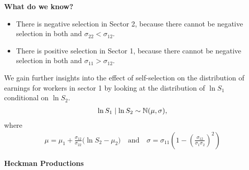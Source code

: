 \begin{frame}
	\textbf{What do we know?}\medskip
	\begin{itemize}\setlength\itemsep{1em}
		\item There is negative selection in Sector 2, because there cannot be negative selection in both and $\sigma_{22} < \sigma_{12}$.
		\item There is positive selection in Sector 1, because there cannot be negative selection in both and $\sigma_{11} > \sigma_{12}$.
	\end{itemize}
\end{frame}
\begin{frame}
	We gain further insights into the effect of self-selection on the distribution of earnings for workers in sector 1 by looking at the  distribution of $\ln S_1$  conditional on $\ln S_2$.
	\begin{align*}
	\ln S_1 \mid \ln S_2 \sim \mathbb{N} (\mu, \sigma),
	\end{align*}
	where
	\begin{align*}
	\mu = \mu_1 + \frac{\sigma_{12}}{\sigma_{22}} \Bigg(\ln S_2 - \mu_2\Bigg) \quad\text{and}\quad
	\sigma = \sigma_{11} \left(1 - \left(\frac{\sigma_{12}}{\sigma_1 \sigma_2}\right)^2\right)
	\end{align*}
\end{frame}
\begin{frame}
	\begin{center}
		\LARGE\textbf{Heckman Productions}
	\end{center}
\end{frame}
{
	
}
